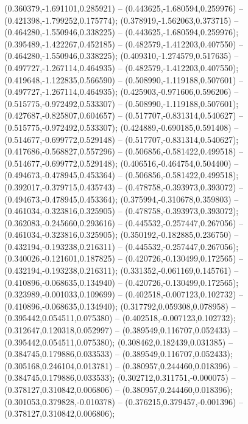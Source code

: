  (0.360379,-1.691101,0.285921) -- (0.443625,-1.680594,0.259976) -- (0.421398,-1.799252,0.175774);
 (0.378919,-1.562063,0.373715) -- (0.464280,-1.550946,0.338225) -- (0.443625,-1.680594,0.259976);
 (0.395489,-1.422267,0.452185) -- (0.482579,-1.412203,0.407550) -- (0.464280,-1.550946,0.338225);
 (0.409310,-1.274579,0.517635) -- (0.497727,-1.267114,0.464935) -- (0.482579,-1.412203,0.407550);
 (0.419648,-1.122835,0.566590) -- (0.508990,-1.119188,0.507601) -- (0.497727,-1.267114,0.464935);
 (0.425903,-0.971606,0.596206) -- (0.515775,-0.972492,0.533307) -- (0.508990,-1.119188,0.507601);
 (0.427687,-0.825807,0.604657) -- (0.517707,-0.831314,0.540627) -- (0.515775,-0.972492,0.533307);
 (0.424889,-0.690185,0.591408) -- (0.514677,-0.699772,0.529148) -- (0.517707,-0.831314,0.540627);
 (0.417686,-0.568827,0.557296) -- (0.506856,-0.581422,0.499518) -- (0.514677,-0.699772,0.529148);
 (0.406516,-0.464754,0.504400) -- (0.494673,-0.478945,0.453364) -- (0.506856,-0.581422,0.499518);
 (0.392017,-0.379715,0.435743) -- (0.478758,-0.393973,0.393072) -- (0.494673,-0.478945,0.453364);
 (0.375994,-0.310678,0.359803) -- (0.461034,-0.323816,0.325905) -- (0.478758,-0.393973,0.393072);
 (0.362083,-0.245660,0.293616) -- (0.445532,-0.257447,0.267056) -- (0.461034,-0.323816,0.325905);
 (0.350192,-0.182885,0.236750) -- (0.432194,-0.193238,0.216311) -- (0.445532,-0.257447,0.267056);
 (0.340026,-0.121601,0.187825) -- (0.420726,-0.130499,0.172565) -- (0.432194,-0.193238,0.216311);
 (0.331352,-0.061169,0.145761) -- (0.410896,-0.068635,0.134940) -- (0.420726,-0.130499,0.172565);
 (0.323989,-0.001033,0.109699) -- (0.402518,-0.007123,0.102732) -- (0.410896,-0.068635,0.134940);
 (0.317792,0.059308,0.078958) -- (0.395442,0.054511,0.075380) -- (0.402518,-0.007123,0.102732);
 (0.312647,0.120318,0.052997) -- (0.389549,0.116707,0.052433) -- (0.395442,0.054511,0.075380);
 (0.308462,0.182439,0.031385) -- (0.384745,0.179886,0.033533) -- (0.389549,0.116707,0.052433);
 (0.305168,0.246104,0.013781) -- (0.380957,0.244460,0.018396) -- (0.384745,0.179886,0.033533);
 (0.302712,0.311751,-0.000075) -- (0.378127,0.310842,0.006806) -- (0.380957,0.244460,0.018396);
 (0.301053,0.379828,-0.010378) -- (0.376215,0.379457,-0.001396) -- (0.378127,0.310842,0.006806);
